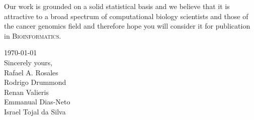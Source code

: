 \documentclass[11pt,a4paper]{letter} %
\begin{document}
\begin{letter}
Our work is grounded on a solid statistical basis and we believe that
it is attractive to a broad spectrum of computational biology
scientists and those of the cancer genomics field and therefore hope
you will consider it for publication in \textsc{Bioinformatics}.

\hfill\today\\

Sincerely yours,\\
Rafael A. Rosales\\ 
Rodrigo Drummond\\ 
Renan Valieris\\ 
Emmanual Dias-Neto\\
Israel Tojal da Silva\\[1em]





\end{letter}
\end{document}
